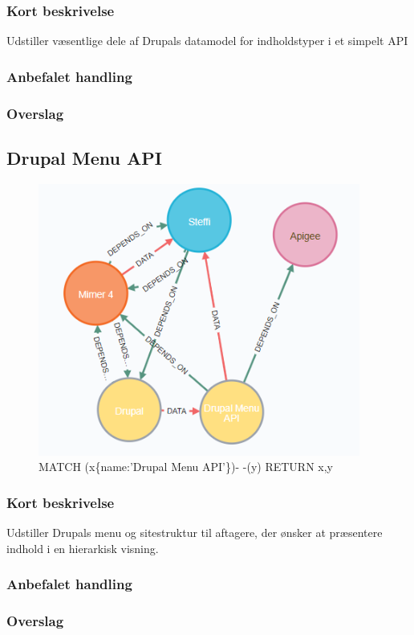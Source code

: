 \documentclass{article}
\begin{document}
\subsubsection{Kort beskrivelse}
Udstiller væsentlige dele af Drupals datamodel for indholdstyper i et simpelt API
\subsubsection{Anbefalet handling}
\subsubsection{Overslag}



\subsection{Drupal Menu API}
\begin{figure}[h]
\includegraphics[width=300pt]{DrupalMenuAPI.PNG}
\caption{MATCH (x\{name:'Drupal Menu API'\})- -(y) RETURN x,y}
\end{figure}
\subsubsection{Kort beskrivelse}
Udstiller Drupals menu og sitestruktur til aftagere, der ønsker at præsentere indhold i en hierarkisk visning.
\subsubsection{Anbefalet handling}
\subsubsection{Overslag}
\end{document}
